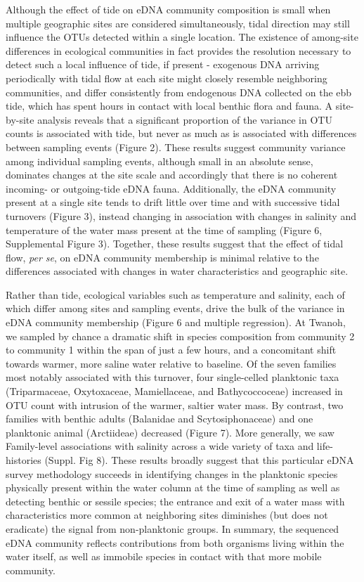 \documentclass[fleqn,10pt,lineno]{wlpeerj} %
\begin{document}
Although the effect of tide on eDNA community composition is small when
multiple geographic sites are considered simultaneously, tidal direction
may still influence the OTUs detected within a single location. The
existence of among-site differences in ecological communities in fact
provides the resolution necessary to detect such a local influence of
tide, if present - exogenous DNA arriving periodically with tidal flow
at each site might closely resemble neighboring communities, and differ
consistently from endogenous DNA collected on the ebb tide, which has
spent hours in contact with local benthic flora and fauna. A
site-by-site analysis reveals that a significant proportion of the
variance in OTU counts is associated with tide, but never as much as is
associated with differences between sampling events (Figure 2). These
results suggest community variance among individual sampling events,
although small in an absolute sense, dominates changes at the site scale
and accordingly that there is no coherent incoming- or outgoing-tide
eDNA fauna. Additionally, the eDNA community present at a single site
tends to drift little over time and with successive tidal turnovers
(Figure 3), instead changing in association with changes in salinity and
temperature of the water mass present at the time of sampling (Figure 6,
Supplemental Figure 3). Together, these results suggest that the effect
of tidal flow, \emph{per se}, on eDNA community membership is minimal
relative to the differences associated with changes in water
characteristics and geographic site.

Rather than tide, ecological variables such as temperature and salinity,
each of which differ among sites and sampling events, drive the bulk of
the variance in eDNA community membership (Figure 6 and multiple
regression). At Twanoh, we sampled by chance a dramatic shift in species
composition from community 2 to community 1 within the span of just a
few hours, and a concomitant shift towards warmer, more saline water
relative to baseline. Of the seven families most notably associated with
this turnover, four single-celled planktonic taxa (Triparmaceae,
Oxytoxaceae, Mamiellaceae, and Bathycoccoceae) increased in OTU count
with intrusion of the warmer, saltier water mass. By contrast, two
families with benthic adults (Balanidae and Scytosiphonaceae) and one
planktonic animal (Arctiideae) decreased (Figure 7). More generally, we
saw Family-level associations with salinity across a wide variety of
taxa and life-histories (Suppl. Fig 8). These results broadly suggest
that this particular eDNA survey methodology succeeds in identifying
changes in the planktonic species physically present within the water
column at the time of sampling as well as detecting benthic or sessile species;
the entrance and exit of a water mass with characteristics more common
at neighboring sites diminishes (but does not eradicate) the signal from
non-planktonic groups. In summary, the sequenced eDNA community reflects
contributions from both organisms living within the water itself, as
well as immobile species in contact with that more mobile community.
\end{document}
